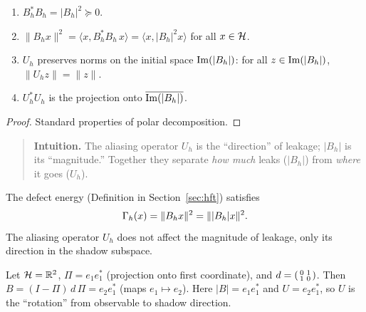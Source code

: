 \begin{corollary}
\label{cor:aliasing-properties}
\begin{enumerate}[label=(\roman*)]
\item $B_h^* B_h = |B_h|^2 \succeq 0$.
\item $\|B_h x\|^2 = \langle x, B_h^* B_h \, x \rangle = \langle x, |B_h|^2 x \rangle$ for all $x \in \cH$.
\item $U_h$ preserves norms on the initial space $\Img(|B_h|)$: for all $z \in \Img(|B_h|)$, $\|U_h z\| = \|z\|$.
\item $U_h^* U_h$ is the projection onto $\overline{\Img(|B_h|)}$.
\end{enumerate}
\end{corollary}

\begin{proof}
Standard properties of polar decomposition.
\end{proof}

\begin{quote}\small
\textbf{Intuition.}
The aliasing operator $U_h$ is the ``direction'' of leakage; $|B_h|$ is its ``magnitude.''
Together they separate \emph{how much} leaks ($|B_h|$) from \emph{where} it goes ($U_h$).
\end{quote}

\begin{remark}
The defect energy (Definition in Section~\ref{sec:hft}) satisfies
\[
\CCDefEnergy{h}{x} = \|\CCLeak{d}{h} x\|^2 = \||\CCLeak{d}{h}| x\|^2.
\]
The aliasing operator $U_h$ does not affect the magnitude of leakage, only its direction in the shadow subspace.
\end{remark}

\begin{example}
\label{ex:finite-aliasing}
Let $\cH = \bbR^2$, $\Pi = e_1 e_1^*$ (projection onto first coordinate), and $d = \begin{psmallmatrix} 0 & 1 \\ 1 & 0 \end{psmallmatrix}$.
Then $B = (I-\Pi)\, d\, \Pi = e_2 e_1^*$ (maps $e_1 \mapsto e_2$).
Here $|B| = e_1 e_1^*$ and $U = e_2 e_1^*$, so $U$ is the ``rotation'' from observable to shadow direction.
\end{example}
